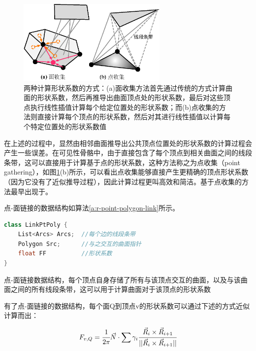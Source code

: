 \begin{figure}
	\sidecaption
	\includegraphics[width=0.65\textwidth]{figures/r/point-gathering}
	\caption{两种计算形状系数的方式：(a)面收集方法首先通过传统的方式计算曲面的形状系数，然后再推导出曲面顶点处的形状系数，最后对这些顶点执行线性插值计算每个给定位置处的形状系数；而(b)点收集的方法则直接计算每个顶点的形状系数，然后对其进行线性插值以计算每个特定位置处的形状系数值}
	\label{f:r-point-gathering}
\end{figure}

在上述的过程中，显然由相邻曲面推导出公共顶点位置处的形状系数的计算过程会产生一些误差。在可见性骨骼中，由于直接包含了每个顶点到相关曲面之间的线段条带，这可以直接用于计算基于点的形状系数，这种方法称之为点收集（point gathering），如图\ref{f:r-point-gathering}(b)所示，可以看出点收集能够直接产生更精确的顶点形状系数（因为它没有了近似推导过程），因此计算过程更叫高效和简洁。基于点收集的方法最早出现于\cite{a:Araytracingalgorithmforprogressiveradiosity}。

点-面链接的数据结构如算法\ref{a:r-point-polygon-link}所示。

\begin{algorithm}
\begin{lstlisting}[language=C++, mathescape]
class LinkPtPoly {
	List<Arcs> Arcs;  //每个边的线段条带
	Polygon Src;      //与之交互的曲面指针
	float FF          //形状系数
}
\end{lstlisting}
\caption{点-面链接数据结构，每个顶点自身存储了所有与该顶点交互的曲面，以及与该曲面之间的所有线段条带，这可以用于计算曲面对于该顶点的形状系数}
\label{a:r-point-polygon-link}
\end{algorithm}

有了点-面链接的数据结构，每个面Q到顶点v的形状系数可以通过下述的方式近似计算而出：

\begin{equation}
	F_{v,Q}= \cfrac{1}{2\pi}\vec{N}\cdot\sum\gamma_i \cfrac{\vec{R}_i\times\vec{R}_{i+1}}{||\vec{R}_i\times\vec{R}_{i+1}||}
\end{equation}

